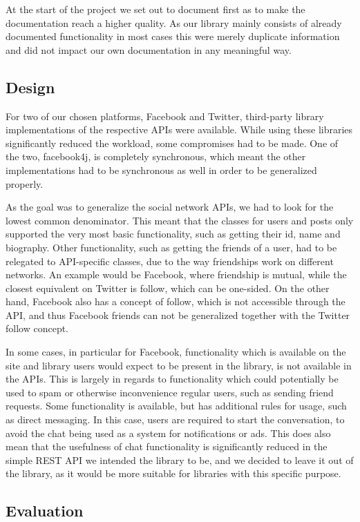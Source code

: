 \documentclass{sigchi-alternate}
\begin{document}
At the start of the project we set out to document first as to make the documentation reach a higher quality. As our library mainly consists of already documented functionality in most cases this were merely duplicate
information and did not impact our own documentation in any meaningful way.

\subsection{Design}
For two of our chosen platforms, Facebook and Twitter, third-party library implementations of the respective APIs were available. While using these libraries significantly reduced the workload, some compromises had to
be made. One of the two, facebook4j, is completely synchronous, which meant the other implementations had to be synchronous as well in order to be generalized properly.

As the goal was to generalize the social network APIs, we had to look for the lowest common denominator. This meant that the classes for users and posts only supported the very most basic functionality, such as getting
their id, name and biography. Other functionality, such as getting the friends of a user, had to be relegated to API-specific classes, due to the way friendships work on different networks. An example would be Facebook,
where friendship is mutual, while the closest equivalent on Twitter is follow, which can be one-sided. On the other hand, Facebook also has a concept of follow, which is not accessible through the API, and thus Facebook
friends can not be generalized together with the Twitter follow concept.

In some cases, in particular for Facebook, functionality which is available on the site and library users would expect to be present in the library, is not available in the APIs. This is largely in regards to functionality
which could potentially be used to spam or otherwise inconvenience regular users, such as sending friend requests. Some functionality is available, but has additional rules for usage, such as direct messaging. In this case,
users are required to start the conversation, to avoid the chat being used as a system for notifications or ads. This does also mean that the usefulness of chat functionality is significantly reduced in the simple REST API
we intended the library to be, and we decided to leave it out of the library, as it would be more suitable for libraries with this specific purpose.

\subsection{Evaluation}
\end{document}
